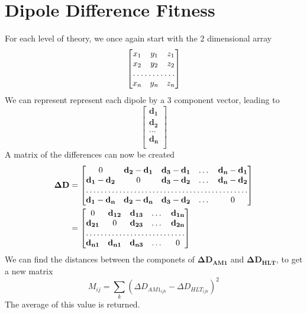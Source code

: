 \documentclass[12pt]{article}
\begin{document}
\section{Dipole Difference Fitness}
For each level of theory, we once again start with the 2 dimensional array
\[
\begin{bmatrix}
  x_{1} & y_{1} & z_{1} \\
  x_{2} & y_{2} & z_{2} \\
  \hdotsfor{3}   \\
  x_n & y_n & z_n
\end{bmatrix}
\]
We can represent represent each dipole by a 3 component vector, leading to
\[
  \begin{bmatrix}
   \mathbf{d_1} \\
   \mathbf{d_2} \\
   \dots        \\
   \mathbf{d_n} \\
  \end{bmatrix}
\]
A matrix of the differences can now be created
\begin{align*}
  \mathbf{\Delta D}&=
  \begin{bmatrix}
    0 & \mathbf{d_2} - \mathbf{d_1} & \mathbf{d_3} - \mathbf{d_1}  & \dots & \mathbf{d_n} - \mathbf{d_1} \\
     \mathbf{d_1} - \mathbf{d_2}  & 0 &  \mathbf{d_3} - \mathbf{d_2}   & \dots &  \mathbf{d_n} - \mathbf{d_2}  \\
    \hdotsfor{5} \\
     \mathbf{d_1} - \mathbf{d_n}  &   \mathbf{d_2} - \mathbf{d_n}  &  \mathbf{d_3} - \mathbf{d_2}   & \dots & 0 
  \end{bmatrix} \\
&=
  \begin{bmatrix}
    0 &  \mathbf{d_{12}}  &  \mathbf{d_{13}}  & \dots &  \mathbf{d_{1n}} \\
    \mathbf{d_{21}}&  0  &  \mathbf{d_{23}}  & \dots &  \mathbf{d_{2n}} \\
    \hdotsfor{5} \\
    \mathbf{d_{n1}} & \mathbf{d_{n1}}  &  \mathbf{d_{n3}}  & \dots & 0
  \end{bmatrix}
\end{align*}
We can find the distances between the componets of  $\mathbf{\Delta D_{AM1}}$ and $\mathbf{\Delta D_{HLT}}$, to get a new matrix 
\begin{equation}
  M_{ij} =  \sum_k (\Delta D_{AM1_{ijk}} - \Delta D_{HLT_{ijk}})^2
\end{equation}
The average of this value is returned.
\end{document}
